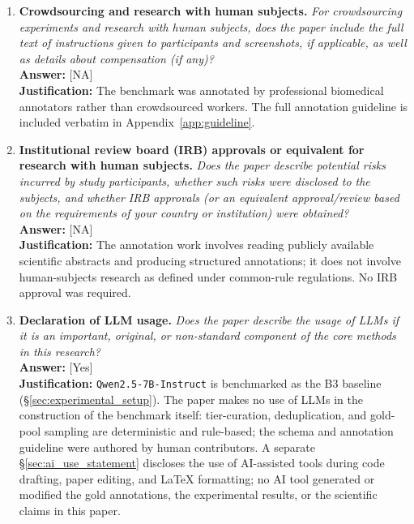 \begin{enumerate}
\item \textbf{Crowdsourcing and research with human subjects.}
\emph{For crowdsourcing experiments and research with human subjects,
does the paper include the full text of instructions given to
participants and screenshots, if applicable, as well as details
about compensation (if any)?}\\
\textbf{Answer:} [NA] \\
\textbf{Justification:} The benchmark was annotated by professional
biomedical annotators rather than crowdsourced workers. The full
annotation guideline is included verbatim in
Appendix~\ref{app:guideline}.

\item \textbf{Institutional review board (IRB) approvals or
equivalent for research with human subjects.}
\emph{Does the paper describe potential risks incurred by study
participants, whether such risks were disclosed to the subjects, and
whether IRB approvals (or an equivalent approval/review based on the
requirements of your country or institution) were obtained?}\\
\textbf{Answer:} [NA] \\
\textbf{Justification:} The annotation work involves reading
publicly available scientific abstracts and producing structured
annotations; it does not involve human-subjects research as defined
under common-rule regulations. No IRB approval was required.

\item \textbf{Declaration of LLM usage.}
\emph{Does the paper describe the usage of LLMs if it is an
important, original, or non-standard component of the core methods
in this research?}\\
\textbf{Answer:} [Yes] \\
\textbf{Justification:} \texttt{Qwen2.5-7B-Instruct} is benchmarked
as the B3 baseline (\S\ref{sec:experimental_setup}). The paper makes
no use of LLMs in the construction of the benchmark itself:
tier-curation, deduplication, and gold-pool sampling are
deterministic and rule-based; the schema and annotation guideline
were authored by human contributors. A separate
\S\ref{sec:ai_use_statement} discloses the use of AI-assisted tools
during code drafting, paper editing, and LaTeX formatting; no AI
tool generated or modified the gold annotations, the experimental
results, or the scientific claims in this paper.

\end{enumerate}
